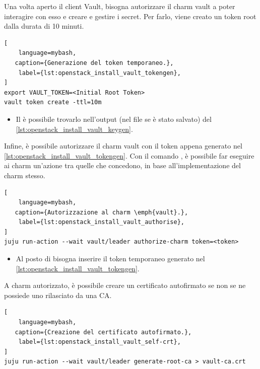 \bigskip\noindent
Una volta aperto il client Vault, bisogna autorizzare il charm vault a poter interagire con esso e creare e gestire i secret.
% 
Per farlo, viene creato un token root dalla durata di 10 minuti.
\begin{lstlisting}[
    language=mybash, 
   caption={Generazione del token temporaneo.},
    label={lst:openstack_install_vault_tokengen},
]
export VAULT_TOKEN=<Initial Root Token>
vault token create -ttl=10m
\end{lstlisting}
\begin{itemize}
    \item Il  è possibile trovarlo nell'output (nel file se è stato salvato) del \cref{lst:openstack_install_vault_keygen}.
\end{itemize}

\bigskip\noindent
Infine, è possibile autorizzare il charm vault con il token appena generato nel \cref{lst:openstack_install_vault_tokengen}.
% 
Con il comando , è possibile far eseguire ai charm un'azione tra quelle che concedono, in base all'implementazione del charm stesso.
\begin{lstlisting}[
    language=mybash, 
   caption={Autorizzazione al charm \emph{vault}.},
    label={lst:openstack_install_vault_authorise},
]
juju run-action --wait vault/leader authorize-charm token=<token>
\end{lstlisting}
\begin{itemize}
    \item Al posto di  bisogna inserire il token temporaneo generato nel \cref{lst:openstack_install_vault_tokengen}.
\end{itemize}


\bigskip\noindent
A charm autorizzato, è possibile creare un certificato autofirmato se non se ne possiede uno rilasciato da una CA.
\begin{lstlisting}[
    language=mybash, 
   caption={Creazione del certificato autofirmato.},
    label={lst:openstack_install_vault_self-crt},
]
juju run-action --wait vault/leader generate-root-ca > vault-ca.crt
\end{lstlisting}


